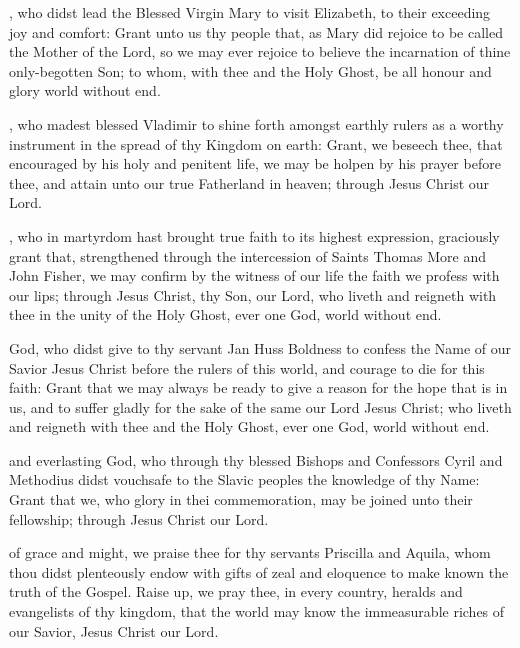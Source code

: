 , who didst lead the Blessed Virgin Mary to visit Elizabeth, to their exceeding joy and comfort: Grant unto us thy people that, as Mary did rejoice to be called the Mother of the Lord, so we may ever rejoice to believe the incarnation of thine only-begotten Son; to whom, with thee and the Holy Ghost, be all honour and glory world without end.

, who madest blessed Vladimir to shine forth amongst earthly rulers as a worthy instrument in the spread of thy Kingdom on earth: Grant, we beseech thee, that encouraged by his holy and penitent life, we may be holpen by his prayer before thee, and attain unto our true Fatherland in heaven; through Jesus Christ our Lord.

, who in martyrdom hast brought true faith to its highest expression, graciously grant that, strengthened through the intercession of Saints Thomas More and John Fisher, we may confirm by the witness of our life the faith we profess with our lips; through Jesus Christ, thy Son, our Lord, who liveth and reigneth with thee in the unity of the Holy Ghost, ever one God, world without end.

 God, who didst give to thy servant Jan Huss Boldness to confess the Name of our Savior Jesus Christ before the rulers of this world, and courage to die for this faith: Grant that we may always be ready to give a reason for the hope that is in us, and to suffer gladly for the sake of the same our Lord Jesus Christ; who liveth and reigneth with thee and the Holy Ghost, ever one God, world without end.

 and everlasting God, who through thy blessed Bishops and Confessors Cyril and Methodius didst vouchsafe to the Slavic peoples the knowledge of thy Name: Grant that we, who glory in thei commemoration, may be joined unto their fellowship; through Jesus Christ our Lord.

 of grace and might, we praise thee for thy servants Priscilla and Aquila, whom thou didst plenteously endow with gifts of zeal and eloquence to make known the truth of the Gospel. Raise up, we pray thee, in every country, heralds and evangelists of thy kingdom, that the world may know the immeasurable riches of our Savior, Jesus Christ our Lord.

